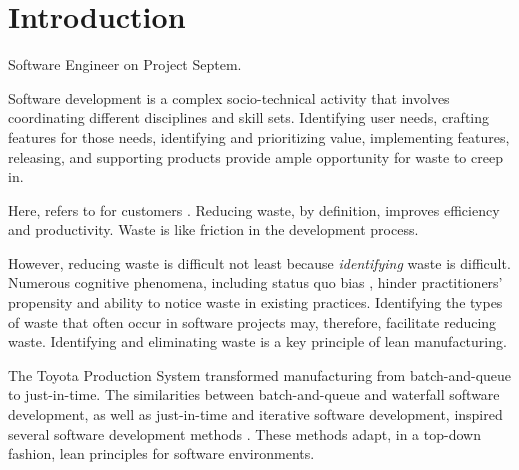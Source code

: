 \section{Introduction}
 \textemdash Software Engineer on Project Septem.

Software development is a complex socio-technical activity that involves coordinating different disciplines and skill sets. Identifying user needs, crafting features for those needs, identifying and prioritizing value, implementing features, releasing, and supporting products provide ample opportunity for waste to creep in. 

Here,  refers to  for customers \cite{WomackLeanThinking}. Reducing waste, by definition, improves efficiency and productivity. Waste is like friction in the development process.

However, reducing waste is difficult not least because \textit{identifying} waste is difficult.  Numerous cognitive phenomena, including status quo bias \cite{JostDecadeOfSystemJustification}, hinder practitioners' propensity and ability to notice waste in existing practices. Identifying the types of waste that often occur in software projects  may, therefore, facilitate reducing waste. Identifying and eliminating waste is a key principle of lean manufacturing. 

The Toyota Production System \cite{OhnoToyotaProductionSystem, ShingoToyotaProductionSystem} transformed manufacturing from batch-and-queue to just-in-time. The similarities between batch-and-queue and waterfall software development, as well as just-in-time and iterative software development, inspired several software development methods \cite{PoppendieckLeanSoftwareDevelopment, AndersonKanban}. These methods adapt, in a top-down fashion, lean principles for software environments. 


